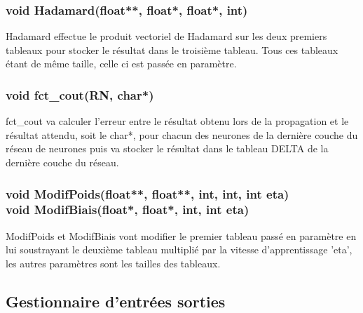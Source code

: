 \documentclass{article}
\begin{document}
			\subsubsection{\textcolor{myblue}{\textbf{void}} Hadamard(\textcolor{myblue}{\textbf{float**}},  \textcolor{myblue}{\textbf{float*}},  \textcolor{myblue}{\textbf{float*}},  \textcolor{myblue}{\textbf{int}})}
				Hadamard effectue le produit vectoriel de Hadamard sur les deux premiers tableaux pour stocker le résultat dans le troisième tableau. Tous ces tableaux étant de même taille, celle ci est passée en paramètre.
				
			\subsubsection{\textcolor{myblue}{\textbf{void}} fct\_cout(\textcolor{myblue}{\textbf{RN}}, \textcolor{myblue}{\textbf{char*}})}
			 fct\_cout va calculer l'erreur entre le résultat obtenu lors de la propagation et le résultat attendu, soit le char*, pour chacun des neurones de la dernière couche du réseau de neurones puis va stocker le résultat dans le tableau DELTA de la dernière couche du réseau.
			
			\subsubsection{\textcolor{myblue}{\textbf{void}} ModifPoids(\textcolor{myblue}{\textbf{float**}},  \textcolor{myblue}{\textbf{float**}},  \textcolor{myblue}{\textbf{int}},  \textcolor{myblue}{\textbf{int}},  \textcolor{myblue}{\textbf{int}} eta)\\
			\textcolor{myblue}{\textbf{void}} ModifBiais(\textcolor{myblue}{\textbf{float*}},  \textcolor{myblue}{\textbf{float*}},  \textcolor{myblue}{\textbf{int}},  \textcolor{myblue}{\textbf{int}} eta)}
			ModifPoids et ModifBiais vont modifier le premier tableau passé en paramètre en lui soustrayant le deuxième tableau multiplié par la vitesse d'apprentissage 'eta', les autres paramètres sont les tailles des tableaux.
		
		
		
	\subsection{Gestionnaire d'entrées sorties}
\end{document}
